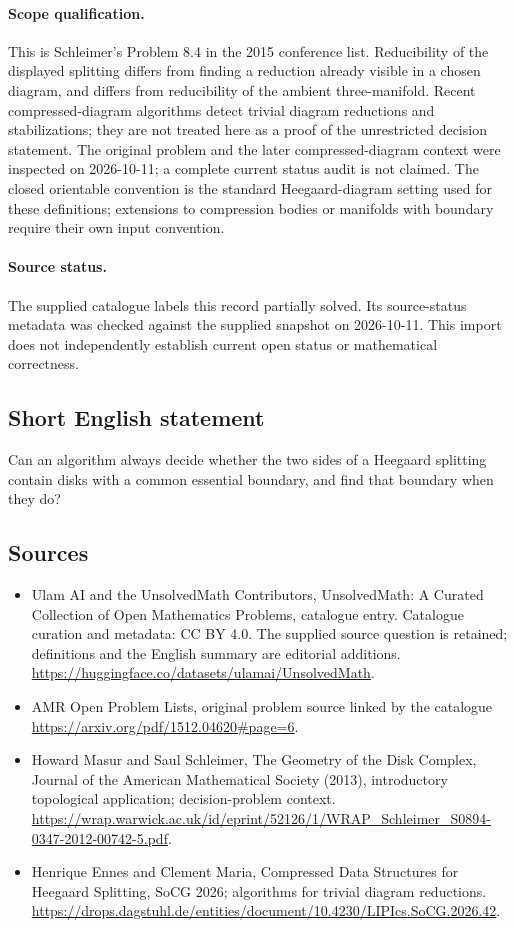 \documentclass[11pt]{article}
\begin{document}
\paragraph{Scope qualification.}
This is Schleimer's Problem 8.4 in the 2015 conference list. Reducibility of the displayed splitting differs from finding a reduction already visible in a chosen diagram, and differs from reducibility of the ambient three-manifold. Recent compressed-diagram algorithms detect trivial diagram reductions and stabilizations; they are not treated here as a proof of the unrestricted decision statement. The original problem and the later compressed-diagram context were inspected on 2026-10-11; a complete current status audit is not claimed. The closed orientable convention is the standard Heegaard-diagram setting used for these definitions; extensions to compression bodies or manifolds with boundary require their own input convention.
\paragraph{Source status.}
The supplied catalogue labels this record partially solved. Its source-status metadata was checked against the supplied snapshot on 2026-10-11. This import does not independently establish current open status or mathematical correctness.
\subsection{Short English statement}
Can an algorithm always decide whether the two sides of a Heegaard splitting contain disks with a common essential boundary, and find that boundary when they do?
\subsection{Sources}
\begin{itemize}
\item[S1] Ulam AI and the UnsolvedMath Contributors, UnsolvedMath: A Curated Collection of Open Mathematics Problems, catalogue entry. Catalogue curation and metadata: CC BY 4.0. The supplied source question is retained; definitions and the English summary are editorial additions.
\url{https://huggingface.co/datasets/ulamai/UnsolvedMath}.
\item[S2] AMR Open Problem Lists, original problem source linked by the catalogue
\url{https://arxiv.org/pdf/1512.04620#page=6}.
\item[S3] Howard Masur and Saul Schleimer, The Geometry of the Disk Complex, Journal of the American Mathematical Society (2013), introductory topological application; decision-problem context.
\url{https://wrap.warwick.ac.uk/id/eprint/52126/1/WRAP_Schleimer_S0894-0347-2012-00742-5.pdf}.
\item[S4] Henrique Ennes and Clement Maria, Compressed Data Structures for Heegaard Splitting, SoCG 2026; algorithms for trivial diagram reductions.
\url{https://drops.dagstuhl.de/entities/document/10.4230/LIPIcs.SoCG.2026.42}.
\end{itemize}
\end{document}
